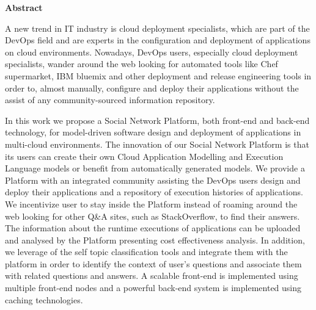 \thispagestyle{empty}
\begin{titlepage}
\begin{center}
{\bf\Large Abstract}\\
\end{center}

\indent A new trend in IT industry is cloud deployment specialists, which are part of the DevOps field and are experts in the configuration and deployment of applications on cloud environments. Nowadays, DevOps users, especially cloud deployment specialists, wander around the web looking for automated tools like Chef supermarket, IBM bluemix and other deployment and release engineering tools in order to, almost manually, configure and deploy their applications without the assist of any community-sourced information repository.

In this work we propose a Social Network Platform, both front-end and back-end technology, for model-driven software design and deployment of applications in multi-cloud environments. 
The innovation of our Social Network Platform is that its users can create their own Cloud Application Modelling and Execution
Language models or benefit from automatically generated models. We provide a Platform with an integrated community assisting the DevOps users design and deploy their applications and a repository of execution histories of applications. We incentivize user to stay inside the Platform instead of roaming around the web looking for other Q\&A sites, such as StackOverflow, to find their answers. The information about the runtime executions of applications can be uploaded and analysed by the Platform presenting cost effectiveness analysis. In addition, we leverage of the self topic classification tools and integrate them with the platform in order to identify the context of user's questions and associate them with related questions and answers. A scalable front-end is implemented using multiple front-end nodes and a powerful back-end system is implemented using caching technologies. 

\vfill
\end{titlepage}

